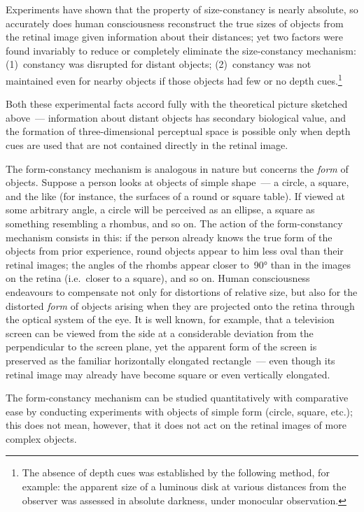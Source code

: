 Experiments have shown that the property of size-constancy is nearly absolute, so
accurately does human consciousness reconstruct the true sizes of objects from the
retinal image given information about their distances; yet two factors were found
invariably to reduce or completely eliminate the size-constancy mechanism:
(1)~constancy was disrupted for distant objects;
(2)~constancy was not maintained even for nearby objects if those objects had few or
no depth cues.\footnote{%
  The absence of depth cues was established by the following method, for example:
  the apparent size of a luminous disk at various distances from the observer was
  assessed in absolute darkness, under monocular observation.}

Both these experimental facts accord fully with the theoretical picture sketched
above~--- information about distant objects has secondary biological value, and the
formation of three-dimensional perceptual space is possible only when depth cues are
used that are not contained directly in the retinal image.

The form-constancy mechanism is analogous in nature but concerns the \emph{form}
of objects.  Suppose a person looks at objects of simple shape~--- a circle, a square, and
the like (for instance, the surfaces of a round or square table).  If viewed at some
arbitrary angle, a circle will be perceived as an ellipse, a square as something
resembling a rhombus, and so on.  The action of the form-constancy mechanism
consists in this: if the person already knows the true form of the objects from prior
experience, round objects appear to him less oval than their retinal images; the angles
of the rhombs appear closer to~90° than in the images on the retina (i.e.\ closer to a
square), and so on.  Human consciousness endeavours to compensate not only for
distortions of relative size, but also for the distorted \emph{form} of objects arising when
they are projected onto the retina through the optical system of the eye.  It is well
known, for example, that a television screen can be viewed from the side at a
considerable deviation from the perpendicular to the screen plane, yet the apparent form
of the screen is preserved as the familiar horizontally elongated rectangle~--- even
though its retinal image may already have become square or even vertically elongated.


The form-constancy mechanism can be studied quantitatively with comparative ease
by conducting experiments with objects of simple form (circle, square, etc.); this does
not mean, however, that it does not act on the retinal images of more complex objects.

